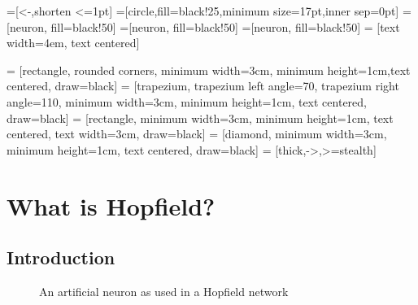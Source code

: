 \documentclass[12pt, right open]{memoir}
\begin{document}

=[<-,shorten <=1pt]
=[circle,fill=black!25,minimum size=17pt,inner sep=0pt]
=[neuron, fill=black!50]
=[neuron, fill=black!50]
=[neuron, fill=black!50]
 = [text width=4em, text centered]

 = [rectangle, rounded corners, minimum width=3cm, minimum height=1cm,text centered, draw=black]
 = [trapezium, trapezium left angle=70, trapezium right angle=110, minimum width=3cm, minimum height=1cm, text centered, draw=black]
 = [rectangle, minimum width=3cm, minimum height=1cm, text centered, text width=3cm, draw=black]
 = [diamond, minimum width=3cm, minimum height=1cm, text centered, draw=black]
 = [thick,->,>=stealth]

\chapter{What is Hopfield?}
\section{Introduction}

\def\layersep{2.5cm}
\begin{figure}[h!]
\caption{An artificial neuron as used in a Hopfield network} 
\label{fig:simple_hopfield_network}
\centering
{}

\end{figure}
\end{document}
